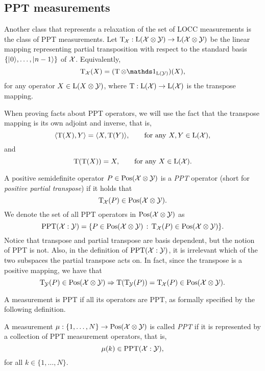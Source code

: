 \subsection{PPT measurements}
\label{sec:ppt-measurements}

Another class that represents a relaxation of the set of LOCC measurements is 
the class of PPT measurements.
Let $\operatorname{T}_{\mspace{-1.5mu}\mathcal{X}}:\mathrm{L}(\mathcal{X}\otimes\mathcal{Y})\rightarrow\mathrm{L}(\mathcal{X}\otimes\mathcal{Y})$ be
the linear mapping representing partial transposition with respect to the
standard basis $\{\lvert\mspace{0.5mu} 0 \mspace{0.5mu} \rangle,\ldots,\lvert\mspace{0.5mu} n-1 \mspace{0.5mu} \rangle\}$ of $\mathcal{X}$. Equivalently,
\begin{equation}
  \pt_{\X}(X) = (\pt\otimes\I_{\Lin(\Y)})(X),
\end{equation}
for any operator $X\in\mathrm{L}(X\otimes\mathcal{Y})$, where $\operatorname{T}:\mathrm{L}(\mathcal{X})\to\mathrm{L}(\mathcal{X})$
is the transpose mapping.

When proving facts about PPT operators, we will use the fact that the transpose 
mapping is its own adjoint and inverse, that is,
\begin{equation}
  \langle \operatorname{T}(X) , Y\rangle = \langle X , \operatorname{T}(Y)\rangle, \qquad\mbox{for any }X,Y\in\mathrm{L}(\mathcal{X}),
\end{equation}
and 
\begin{equation}
  \operatorname{T}(\operatorname{T}(X)) = X,\qquad\mbox{for any }X\in\mathrm{L}(\mathcal{X}).
\end{equation}

A positive semidefinite operator $P\in \mathrm{Pos}(\mathcal{X}\otimes\mathcal{Y})$ is a \emph{PPT} operator 
(short for \emph{positive partial transpose}) if it holds that
\begin{equation}
  \operatorname{T}_{\mspace{-1.5mu}\mathcal{X}}(P) \in \mathrm{Pos}(\mathcal{X}\otimes\mathcal{Y}).
\end{equation}
We denote the set of all PPT operators in $\mathrm{Pos}(\mathcal{X}\otimes\mathcal{Y})$ as 
\begin{equation}
\mathrm{PPT}(\mathcal{X}:\mathcal{Y}) = \{ P \in \mathrm{Pos}(\mathcal{X}\otimes\mathcal{Y}) \,:\,
    \operatorname{T}_{\mathcal{X}}(P) \in \mathrm{Pos}(\mathcal{X}\otimes\mathcal{Y}) \}.
\end{equation}
Notice that transpose and partial transpose are basis dependent, but the notion of PPT
is not. Also, in the definition of $\mathrm{PPT}(\mathcal{X}:\mathcal{Y})$, it is irrelevant which of the two subspaces the partial transpose acts on. In fact, since the transpose is a positive mapping, we have that
\begin{equation}
  \operatorname{T}_{\mspace{-1.5mu}\mathcal{Y}}(P) \in \mathrm{Pos}(\mathcal{X}\otimes\mathcal{Y})\Rightarrow
  \operatorname{T}(\operatorname{T}_{\mspace{-1.5mu}\mathcal{Y}}(P)) = \operatorname{T}_{\mspace{-1.5mu}\mathcal{X}}(P) 
    \in \mathrm{Pos}(\mathcal{X}\otimes\mathcal{Y}).
\end{equation}

A measurement is PPT if all its operators are PPT, as formally specified by the following
definition.  
\begin{definition}
\label{def:ppt-measurements}
A measurement $\mu : \{1, \ldots, N\}\rightarrow\mathrm{Pos}(\mathcal{X}\otimes\mathcal{Y})$ is called 
\emph{PPT} if it is represented by a collection
of PPT measurement operators, that is,
\begin{equation}
\mu(k) \in \mathrm{PPT}(\mathcal{X}:\mathcal{Y}),
\end{equation}
for all $k \in \{1,\ldots,N\}$.
\end{definition}

